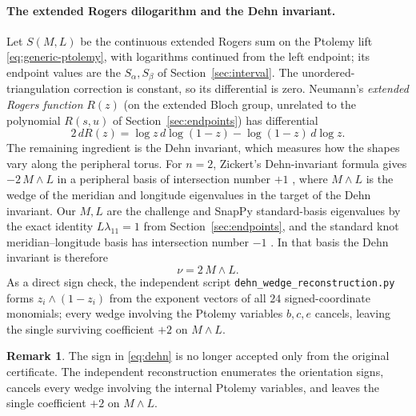 \documentclass[11pt]{article}
\theoremstyle{definition}
\newtheorem{remark}{Remark}
\begin{document}
\paragraph{The extended Rogers dilogarithm and the Dehn invariant.}
Let $S(M,L)$ be the continuous extended Rogers sum on the Ptolemy lift
\eqref{eq:generic-ptolemy}, with logarithms continued from the left endpoint; its
endpoint values are the $S_\alpha,S_\beta$ of Section~\ref{sec:interval}.  The
unordered-triangulation correction is constant, so its differential is zero.
Neumann's \emph{extended Rogers function} $R(z)$ (on the extended Bloch group,
unrelated to the polynomial $R(s,u)$ of Section~\ref{sec:endpoints}) has
differential
\begin{equation}\label{eq:dR}
 2\,dR(z)=\log z\,d\log(1-z)-\log(1-z)\,d\log z.
\end{equation}
The remaining ingredient is the Dehn invariant, which measures how the shapes
vary along the peripheral torus.  For $n=2$, Zickert's Dehn-invariant formula
gives $-2\,M\wedge L$ in a peripheral basis of intersection number $+1$
\cite[Theorem~1.10]{ZickertPtolemy}, where $M\wedge L$ is the wedge of the
meridian and longitude eigenvalues in the target of the Dehn invariant.  Our
$M,L$ are the challenge and SnapPy standard-basis eigenvalues by the exact
identity $L\lambda_{11}=1$ from Section~\ref{sec:endpoints}, and the standard
knot meridian--longitude basis has intersection number $-1$
\cite[Section~3.1]{ZickertPtolemy}.  In that basis the Dehn invariant is
therefore
\begin{equation}\label{eq:dehn}
 \nu=2\,M\wedge L.
\end{equation}
As a direct sign check, the independent script
\texttt{dehn\_wedge\_reconstruction.py} forms $z_i\wedge(1-z_i)$ from the
exponent vectors of all $24$ signed-coordinate monomials; every wedge involving
the Ptolemy variables $b,c,e$ cancels, leaving the single surviving coefficient
$+2$ on $M\wedge L$.

\begin{remark}
The sign in \eqref{eq:dehn} is no longer accepted only from the original
certificate.  The independent reconstruction enumerates the orientation signs,
cancels every wedge involving the internal Ptolemy variables, and leaves the
single coefficient $+2$ on $M\wedge L$.
\end{remark}
\end{document}
